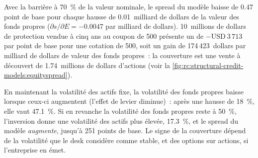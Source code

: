 \begin{example}\label{ex:rc:structural-credit-models:hedge}
Avec la barrière à 70~\% de la valeur nominale, le spread du modèle baisse de 0.47 point de base pour
chaque hausse de 0.01~milliard de dollars de la valeur des fonds propres ($\partial s/\partial E = -0.0047$ par
milliard de dollars). 10~millions de dollars de protection vendue à cinq ans au coupon de 500 présente un  de
$-\text{USD}~3\,713$ par point de base pour une cotation de 500, soit un gain de 174\,423~dollars par
milliard de dollars de valeur des fonds propres~: la couverture est une vente à découvert de 1.74~millions de dollars d'actions
(voir la \cref{fig:rc:structural-credit-models:equityspread}).
\end{example}

\begin{omfigure}

\label{fig:rc:structural-credit-models:equityspread}
\end{omfigure}

\begin{remark}\label{rem:rc:structural-credit-models:vol}
En maintenant la volatilité des actifs fixe, la volatilité des fonds propres baisse lorsque ceux-ci augmentent
(l'effet de levier diminue)~: après une hausse de 18~\%, elle vaut 47.1~\%. Si en revanche la volatilité des fonds propres reste à
50~\%, l'inversion donne une volatilité des actifs plus élevée, 17.3~\%, et le spread du modèle
\emph{augmente}, jusqu'à 251 points de base. Le signe de la couverture dépend de la volatilité que le
desk considère comme stable, et des options sur actions, si l'entreprise en émet.
\end{remark}

